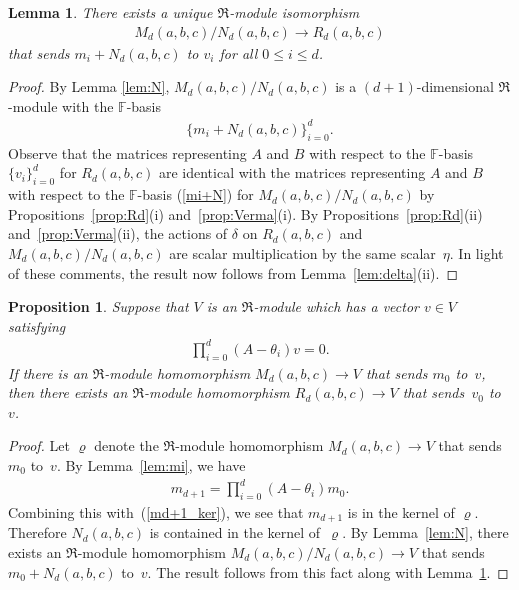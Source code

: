 \documentclass[pdftex]{sigma}
\def\F{\mathbb F}
\numberwithin{equation}{section}
\newtheorem{Lemma}[Theorem]{Lemma}
\newtheorem{Proposition}[Theorem]{Proposition}
 { \theoremstyle{definition}
\newtheorem{Definition}[Theorem]{Definition}
\newtheorem{Example}[Theorem]{Example} }
\begin{document}
\begin{Lemma}\label{lem:M/N}There exists a unique $\Re$-module isomorphism
\begin{gather*}
M_d(a,b,c)/N_d(a,b,c)\to R_d(a,b,c)
\end{gather*}
that sends $m_i+N_d(a,b,c)$ to $v_i$ for all $0\leq i\leq d$.
\end{Lemma}
\begin{proof}By Lemma \ref{lem:N}, $M_d(a,b,c)/N_d(a,b,c)$ is a $(d+1)$-dimensional $\Re$-module with the $\F$-basis
\begin{gather}\label{mi+N}
\{m_i+N_d(a,b,c)\}_{i=0}^d.
\end{gather}
Observe that the matrices representing $A$ and $B$ with respect to the $\F$-basis $\{v_i\}_{i=0}^d$ for $R_d(a,b,c)$ are identical with the matrices representing $A$ and $B$ with respect to the $\F$-basis (\ref{mi+N}) for $M_d(a,b,c)/N_d(a,b,c)$ by Propositions~\ref{prop:Rd}(i) and~\ref{prop:Verma}(i). By Propositions~\ref{prop:Rd}(ii) and~\ref{prop:Verma}(ii), the actions of $\delta$ on $R_d(a,b,c)$ and $M_d(a,b,c)/N_d(a,b,c)$ are scalar multiplication by the same scalar~$\eta$. In light of these comments, the result now follows from Lemma~\ref{lem:delta}(ii).
\end{proof}

\begin{Proposition}\label{prop:R}Suppose that $V$ is an $\Re$-module which has a vector $v\in V$ satisfying
\begin{gather}\label{md+1_ker}
\prod_{i=0}^d (A-\theta_i) v=0.
\end{gather}
If there is an $\Re$-module homomorphism $M_d(a,b,c)\to V$ that sends $m_0$ to~$v$, then there exists an $\Re$-module homomorphism $R_d(a,b,c)\to V$ that sends~$v_0$ to~$v$.
\end{Proposition}
\begin{proof}Let $\varrho$ denote the $\Re$-module homomorphism $M_d(a,b,c)\to V$ that sends~$m_0$ to~$v$. By Lemma~\ref{lem:mi}, we have
\begin{gather*}
m_{d+1}=\prod_{i=0}^d (A-\theta_i) m_0.
\end{gather*}
Combining this with~(\ref{md+1_ker}), we see that $m_{d+1}$ is in the kernel of $\varrho$. Therefore $N_d(a,b,c)$ is contained in the kernel of~$\varrho$. By Lemma~\ref{lem:N}, there exists an $\Re$-module homomorphism $M_d(a,b,c)/N_d(a,b,c)\to V$ that sends $m_0+N_d(a,b,c)$ to~$v$. The result follows from this fact along with Lemma~\ref{lem:M/N}.
\end{proof}
\end{document}
